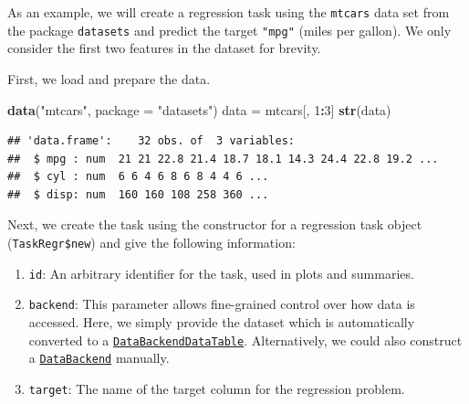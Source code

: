 \documentclass[]{scrbook}
\newenvironment{Shaded}{\begin{snugshade}}{\end{snugshade}}
\newcommand{\DataTypeTok}[1]{\textcolor[rgb]{0.13,0.29,0.53}{#1}}
\newcommand{\DecValTok}[1]{\textcolor[rgb]{0.00,0.00,0.81}{#1}}
\newcommand{\KeywordTok}[1]{\textcolor[rgb]{0.13,0.29,0.53}{\textbf{#1}}}
\newcommand{\NormalTok}[1]{#1}
\newcommand{\OperatorTok}[1]{\textcolor[rgb]{0.81,0.36,0.00}{\textbf{#1}}}
\newcommand{\StringTok}[1]{\textcolor[rgb]{0.31,0.60,0.02}{#1}}
\providecommand{\tightlist}{%
  \setlength{\itemsep}{0pt}\setlength{\parskip}{0pt}}
\renewenvironment{Shaded} {\begin{snugshade}\small} {\end{snugshade}}
\begin{document}
As an example, we will create a regression task using the \texttt{mtcars} data set from the package \texttt{datasets} and predict the target \texttt{"mpg"} (miles per gallon).
We only consider the first two features in the dataset for brevity.

First, we load and prepare the data.

\begin{Shaded}
\begin{Highlighting}[]
\KeywordTok{data}\NormalTok{(}\StringTok{"mtcars"}\NormalTok{, }\DataTypeTok{package =} \StringTok{"datasets"}\NormalTok{)}
\NormalTok{data =}\StringTok{ }\NormalTok{mtcars[, }\DecValTok{1}\OperatorTok{:}\DecValTok{3}\NormalTok{]}
\KeywordTok{str}\NormalTok{(data)}
\end{Highlighting}
\end{Shaded}

\begin{verbatim}
## 'data.frame':    32 obs. of  3 variables:
##  $ mpg : num  21 21 22.8 21.4 18.7 18.1 14.3 24.4 22.8 19.2 ...
##  $ cyl : num  6 6 4 6 8 6 8 4 4 6 ...
##  $ disp: num  160 160 108 258 360 ...
\end{verbatim}

Next, we create the task using the constructor for a regression task object (\texttt{TaskRegr\$new}) and give the following information:

\begin{enumerate}
\def\labelenumi{\arabic{enumi}.}
\tightlist
\item
  \texttt{id}: An arbitrary identifier for the task, used in plots and summaries.
\item
  \texttt{backend}: This parameter allows fine-grained control over how data is accessed.
  Here, we simply provide the dataset which is automatically converted to a \href{https://mlr3.mlr-org.com/reference/DataBackendDataTable.html}{\texttt{DataBackendDataTable}}.
  Alternatively, we could also construct a \href{https://mlr3.mlr-org.com/reference/DataBackend.html}{\texttt{DataBackend}} manually.
\item
  \texttt{target}: The name of the target column for the regression problem.
\end{enumerate}

\begin{Shaded}
\end{Shaded}
\end{document}
